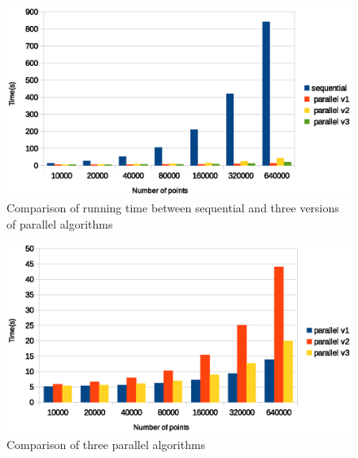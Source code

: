 \begin{figure}[!h]
  \centering
  \includegraphics[width=\linewidth]{fig/all_comparison}
  \caption{Comparison of running time between sequential and three versions of parallel algorithms}
  \label{fig:all}
\end{figure}
\begin{figure}[ht]
  \centering
  \includegraphics[width=\linewidth]{fig/parallel_algorithm_comparison}
  \caption{Comparison of three parallel algorithms}
  \label{fig:par}
\end{figure}
